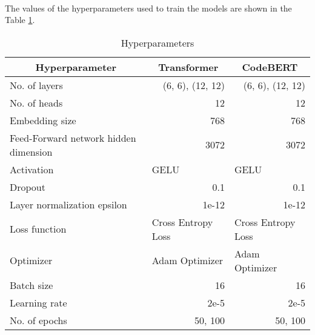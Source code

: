 \
\\
The values of the hyperparameters used to train the models are shown in the Table \ref{table:5.1}.
\begin{table}[H]
\centering
\def\arraystretch{1.25}
\caption{Hyperparameters}
\label{table:5.1}
\begin{tabular}{|l|l|l|} \hline
\multicolumn{1}{|c|}{\textbf{Hyperparameter}} & \multicolumn{1}{|c|}{\textbf{Transformer}} & \multicolumn{1}{|c|}{\textbf{CodeBERT}}\\ \hline
No. of layers & \multicolumn{1}{|r|}{(6, 6), (12, 12)} & \multicolumn{1}{|r|}{(6, 6), (12, 12)} \\ \hline
No. of heads & \multicolumn{1}{|r|}{12} & \multicolumn{1}{|r|}{12} \\ \hline
Embedding size & \multicolumn{1}{|r|}{768} & \multicolumn{1}{|r|}{768} \\ \hline
Feed-Forward network hidden dimension & \multicolumn{1}{|r|}{3072} & \multicolumn{1}{|r|}{3072}  \\ \hline
Activation & GELU & GELU  \\ \hline
Dropout & \multicolumn{1}{|r|}{0.1} & \multicolumn{1}{|r|}{0.1}  \\ \hline
Layer normalization epsilon & \multicolumn{1}{|r|}{1e-12} & \multicolumn{1}{|r|}{1e-12}  \\ \hline
Loss function & Cross Entropy Loss & Cross Entropy Loss  \\ \hline
Optimizer & Adam Optimizer & Adam Optimizer  \\ \hline
Batch size & \multicolumn{1}{|r|}{16} & \multicolumn{1}{|r|}{16}  \\ \hline
Learning rate & \multicolumn{1}{|r|}{2e-5} & \multicolumn{1}{|r|}{2e-5}  \\ \hline
No. of epochs & \multicolumn{1}{|r|}{50, 100} & \multicolumn{1}{|r|}{50, 100}  \\ \hline
\end{tabular}
\end{table}
